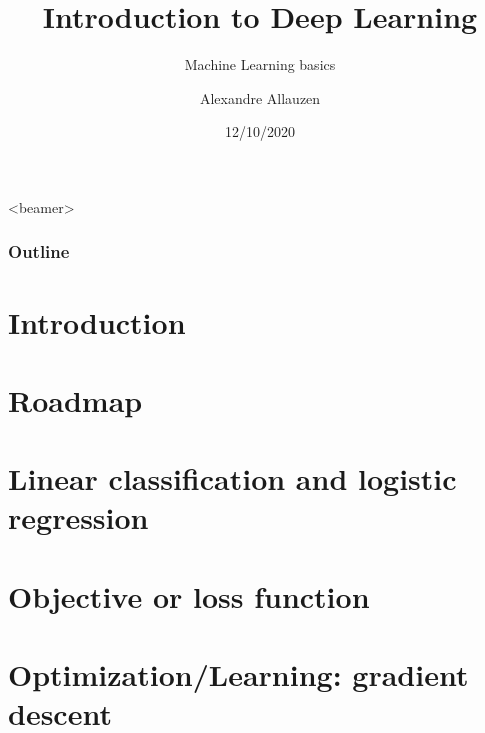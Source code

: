 \documentclass[10pt]{beamer}
\title[IDL@BME-BIN] %
{Introduction to Deep Learning}
\subtitle{Machine Learning basics}
\author[A. Allauzen] %
{Alexandre Allauzen}
\institute[ESPCI/Dauphine/PSL] %
{
\texttt{[image: ../logos/espci\_blue.png]}\hfill
\raisebox{1.75ex}{\texttt{[image: ../logos/dauphine.png]}}\\
\hfill\texttt{[image: ../logos/logomiles\_white.pdf]}
}
\date{12/10/2020} %
\begin{document}

\begin{frame}
  \titlepage
\end{frame}

  \begin{frame}<beamer>
    \frametitle{Outline}
    \tableofcontents
  \end{frame}
 


  
  
\section{Introduction}


\section{Roadmap}



\section{Linear classification and logistic regression}


\section{Objective or loss function}


\section{Optimization/Learning: gradient descent}

\end{document}
